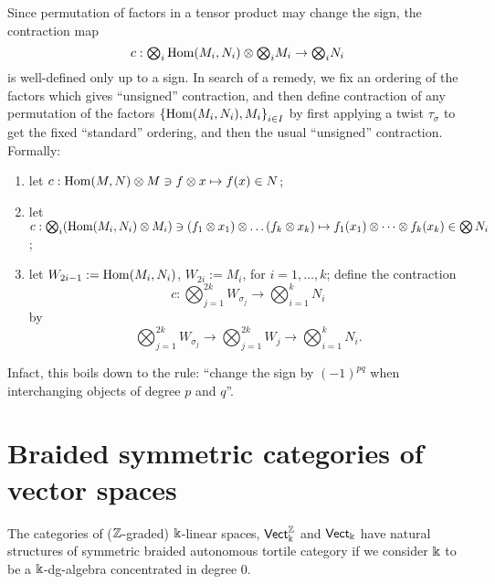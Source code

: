 Since permutation of factors in a tensor product may change the sign,
the contraction map 
\begin{equation*}
c: {\textstyle \bigotimes_i} \Hom(M_i, N_i) \otimes
 {\textstyle \bigotimes_i} M_i \to  {\textstyle \bigotimes_i} N_i
\end{equation*}
is well-defined only up to a sign. In search of a remedy, we fix an
ordering of the factors which gives ``unsigned'' contraction, and then
define contraction of any permutation of the factors
$\left\{\Hom(M_i,N_i), M_i\right\}_{i\in I}$ by first applying a twist
$\tau_\sigma$ to get the fixed ``standard'' ordering, and then the usual
``unsigned'' contraction. Formally:
\begin{enumerate}
\item let $c: \Hom(M,N) \otimes M \ni f\otimes x \mapsto f(x) \in N$;
\item let $c: \bigotimes_i (\Hom(M_i, N_i) \otimes M_i) \ni (f_1\otimes x_1)
  \otimes \dots (f_k\otimes x_k) \mapsto f_1(x_1) \otimes \dots
  \otimes f_k(x_k) \in \bigotimes N_i$;
\item let $W_{2i-1} := \Hom(M_i, N_i)$, $W_{2i} := M_i$, for $i =
  1, \dots, k$; define the contraction
  \begin{equation*}
    c: {\textstyle \bigotimes_{j=1}^{2k}} W_{\sigma_j} \to
    {\textstyle \bigotimes_{i=1}^k} N_i
  \end{equation*}
  by 
  \begin{equation*}
    {\textstyle \bigotimes_{j=1}^{2k}} W_{\sigma_j} \to {\textstyle \bigotimes_{j=1}^{2k}} W_j \to
    {\textstyle \bigotimes_{i=1}^{k}} N_i.
  \end{equation*}
\end{enumerate}

Infact, this boils down to the rule: ``change the sign by
$(-1)^{pq}$ when interchanging objects of degree $p$ and $q$''.


\section{Braided symmetric categories of vector spaces}
\label{sec:btc-vect}

The categories of ($\setZ$-graded) $\fk$-linear spaces, $\catVect[\fk]^\setZ$
and $\catVect[\fk]$ have natural structures of symmetric braided
autonomous tortile category if we consider $\fk$ to be a
$\fk$-dg-algebra concentrated in degree $0$.

